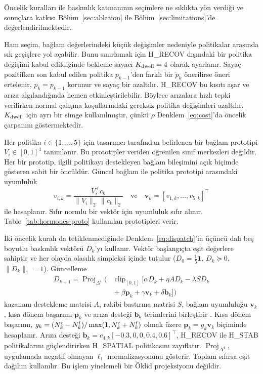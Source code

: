 \documentclass[10pt,letterpaper,onecolumn]{IEEEtran}
\begin{document}
Öncelik kuralları ile baskınlık katmanının seçimlere ne sıklıkta yön verdiği ve
sonuçlara katkısı Bölüm~\ref{sec:ablation} ile
Bölüm~\ref{sec:limitations}'de değerlendirilmektedir.

Ham seçim, bağlam değerlerindeki küçük değişimler nedeniyle politikalar
arasında sık geçişlere yol açabilir. Bunu sınırlamak için H\_RECOV dışındaki
bir politika değişimi kabul edildiğinde bekleme sayacı $K_{\rm dwell}=4$
olarak ayarlanır. Sayaç pozitifken son kabul edilen politika $p_{k-1}$'den
farklı bir $\tilde p_k$ önerilirse öneri ertelenir, $p_k=p_{k-1}$ korunur ve
sayaç bir azaltılır. H\_RECOV bu kısıtı aşar ve arıza algılandığında hemen
etkinleştirilebilir. Böylece arızalara hızlı tepki verilirken normal çalışma
koşullarındaki gereksiz politika değişimleri azaltılır. $K_{\rm dwell}$ için
ayrı bir simge kullanılmıştır, çünkü $\rho$ Denklem~\eqref{eq:cost}'da öncelik
çarpanını göstermektedir.


\label{sec:dominance}

Her politika $i\in\{1,\ldots,5\}$ için tasarımcı tarafından belirlenen bir
bağlam prototipi $V_i\in[0,1]^4$ tanımlanır. Bu prototipler veriden öğrenilen
sınıf merkezleri değildir. Her bir prototip, ilgili politikayı destekleyen
bağlam bileşimini açık biçimde gösteren sabit bir öncüldür. Güncel bağlam ile
politika prototipi arasındaki uyumluluk
\begin{equation}
 v_{i,k}=\frac{V_i^\top c_k}{\|V_i\|_2\,\|c_k\|_2}
 \quad\text{ve}\quad \mathbf v_k=[v_{1,k},\ldots,v_{5,k}]^\top
 \label{eq:context-compatibility}
\end{equation}
ile hesaplanır. Sıfır normlu bir vektör için uyumluluk sıfır alınır.
Tablo~\ref{tab:hormones-proto} kullanılan prototipleri verir.



İki öncelik kuralı da tetiklenmediğinde Denklem~\eqref{eq:dispatch}'in üçüncü
dalı beş boyutlu baskınlık vektörü $D_k$'yı kullanır. Vektör başlangıçta eşit
değerlere sahiptir ve her olayda olasılık simpleksi içinde tutulur
($D_0=\frac15\mathbf1$, $D_k\succeq0$, $\|D_k\|_1=1$). Güncelleme
\begin{equation}
\begin{aligned}
 D_{k+1}=\operatorname{Proj}_{\Delta^4}\!\Big(&
 \operatorname{clip}_{[0,1]}\big[\alpha D_k+\eta A D_k-\lambda S D_k\\
 &{}+\beta\mathbf p_k+\gamma\mathbf v_k+\delta\mathbf b_k\big]\Big)
\end{aligned}
\label{eq:dominance}
\end{equation}
kazananı destekleme matrisi $A$, rakibi bastırma matrisi $S$, bağlam uyumluluğu
$\mathbf v_k$, kısa dönem başarımı $\mathbf p_k$ ve arıza desteği
$\mathbf b_k$ terimlerini birleştirir \cite{peng2023competition}. Kısa dönem
başarımı, $g_k=(N^{\rm c}_k-N^{\rm f}_k)/\max(1,N^{\rm c}_k+N^{\rm f}_k)$
olmak üzere $\mathbf p_k=g_k\mathbf v_k$ biçiminde hesaplanır. Arıza desteği
$\mathbf b_k=c_{4,k}[-0.3,0,0,0.4,0.6]^\top$, H\_RECOV ile H\_STAB
politikalarını güçlendirirken H\_SPATIAL politikasını zayıflatır.
$\operatorname{Proj}_{\Delta^4}$, uygulamada negatif olmayan $\ell_1$
normalizasyonunu gösterir. Toplam sıfırsa eşit dağılım kullanılır. Bu işlem
yinelemeli bir Öklid projeksiyonu değildir.
\end{document}
